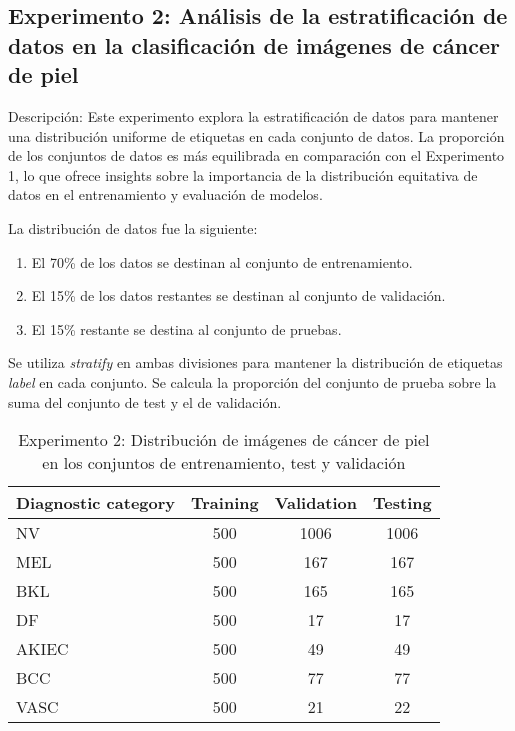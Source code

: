 \subsection{Experimento 2: Análisis de la estratificación de datos en la clasificación de imágenes de cáncer de piel}

Descripción: Este experimento explora la estratificación de datos para mantener una distribución uniforme de etiquetas en cada conjunto de datos. La proporción de los conjuntos de datos es más equilibrada en comparación con el Experimento 1, lo que ofrece insights sobre la importancia de la distribución equitativa de datos en el entrenamiento y evaluación de modelos.

La distribución de datos fue la siguiente:

   \begin{enumerate}
      \item El 70\% de los datos se destinan al conjunto de entrenamiento.
      \item El 15\% de los datos restantes se destinan al conjunto de validación.
      \item El 15\% restante se destina al conjunto de pruebas.
   \end{enumerate}
   
Se utiliza \textit{stratify} en ambas divisiones para mantener la distribución de etiquetas \textit{label} en cada conjunto. Se calcula la proporción del conjunto de prueba sobre la suma del conjunto de test y el de validación.

   \begin{table}[ht]
      \centering
      \begin{tabular}{lccc}
      \hline
      \textbf{Diagnostic category} & \textbf{Training} & \textbf{Validation} & \textbf{Testing} \\
      \hline
      NV    & 500 & 1006 & 1006 \\
      MEL   & 500 & 167  & 167  \\
      BKL   & 500 & 165  & 165  \\
      DF    & 500 & 17   & 17   \\
      AKIEC & 500 & 49   & 49   \\
      BCC   & 500 & 77   & 77   \\
      VASC  & 500 & 21   & 22   \\
      \hline
      \end{tabular}
      \caption{Experimento 2: Distribución de imágenes de cáncer de piel en los conjuntos de entrenamiento, test y validación}
      \label{tab:train_test_validate_e2}
      \end{table}
      

